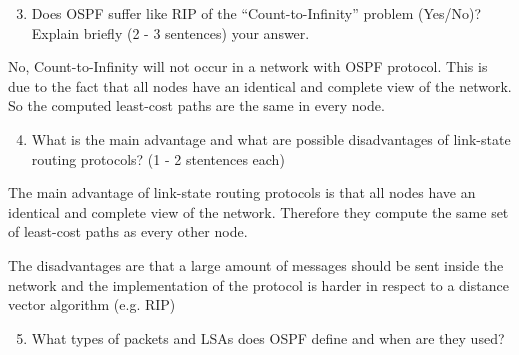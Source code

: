 \begin{enumerate}
    \setcounter{enumi}{2}
    \item
    Does OSPF suffer like RIP of the “Count-to-Infinity” problem (Yes/No)? Explain 
    briefly (2 - 3 sentences) your answer.

\end{enumerate}
\begin{tcolorbox}
    \mysolution{} 
    No, Count-to-Infinity will not occur in a network with OSPF protocol. This is due to the fact
    that all nodes have an identical and complete view of the network. So the computed least-cost
    paths are the same in every node.
\end{tcolorbox}



\begin{enumerate}
    \setcounter{enumi}{3}
    \item
    What is the main advantage and what are possible disadvantages of link-state routing 
    protocols? (1 - 2 stentences each)

    \end{enumerate}

\begin{tcolorbox}
    \mysolution{} 
    The main advantage of link-state routing protocols is that all nodes have an identical and
    complete view of the network. Therefore they compute the same set of least-cost paths as 
    every other node. 

    The disadvantages are that a large amount of messages should be sent inside the network and the 
    implementation of the protocol is harder in respect to a distance vector algorithm (e.g. RIP)
\end{tcolorbox}


\begin{enumerate}
    \setcounter{enumi}{4}
    \item
    What types of packets and LSAs does OSPF define and when are they used?
\end{enumerate}

